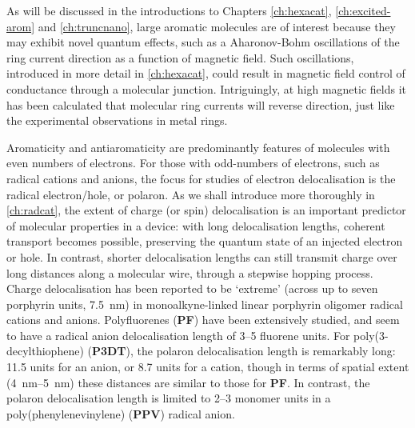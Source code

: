 		As will be discussed in the introductions to Chapters \ref{ch:hexacat}, \ref{ch:excited-arom} and \ref{ch:truncnano}, large aromatic molecules are of interest because they may exhibit novel quantum effects, such as a Aharonov-Bohm oscillations of the ring current direction as a function of magnetic field.\autocite{Bleszynski-Jayich2009,Mayor2003} Such oscillations, introduced in more detail in \autoref{ch:hexacat}, could result in magnetic field control of conductance through a molecular junction.\autocite{Hod2006,Rai2011} Intriguingly, at high magnetic fields it has been calculated that molecular ring currents will reverse direction,\autocite{Soncini2004,Tellgren2009} just like the experimental observations in metal rings.\autocite{Chandrasekhar1991}

		Aromaticity and antiaromaticity are predominantly features of molecules with even numbers of electrons. For those with odd-numbers of electrons, such as radical cations and anions, the focus for studies of electron delocalisation is the radical electron/hole, or polaron. As we shall introduce more thoroughly in \autoref{ch:radcat}, the extent of charge (or spin) delocalisation is an important predictor of molecular properties in a device: with long delocalisation lengths, coherent transport becomes possible, preserving the quantum state of an injected electron or hole.\autocite{Heckmann2012} In contrast, shorter delocalisation lengths can still transmit charge over long distances along a molecular wire, through a stepwise hopping process.\autocite{Heckmann2012} Charge delocalisation has been reported to be `extreme' (across up to seven porphyrin units, \SI{7.5}{\nano\metre}) in monoalkyne-linked linear porphyrin oligomer radical cations and anions.\autocite{Susumu2006,Therien2015} Polyfluorenes (\textbf{PF}) have been extensively studied, and seem to have a radical anion delocalisation length of 3--5 fluorene units.\autocite{Takeda2006,Zaikowski2012,Bakalis2014} For poly(3-decylthiophene) (\textbf{P3DT}), the polaron delocalisation length is remarkably long: 11.5 units for an anion, or 8.7 units for a cation,\autocite{Takeda2012} though in terms of spatial extent (\SIrange{4}{5}{\nano\metre}) these distances are similar to those for \textbf{PF}. In contrast, the polaron delocalisation length is limited to 2--3 monomer units in a poly(phenylenevinylene) (\textbf{PPV}) radical anion.\autocite{Nguyen2010,Bakalis2014}

